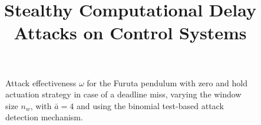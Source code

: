 \documentclass{article}
\title{Stealthy Computational Delay Attacks on Control Systems}
\renewcommand{\a}{a}
\newcommand{\maxa}{\bar{\a}}
\newcommand{\vecsize}[1]{n_{#1}}
\newcommand{\iteration}{w}
\newcommand{\aeffect}{\omega}
\begin{document}
\maketitle

\begin{figure*}
    \centering
    
    \vspace{-1cm}
    \caption{Attack effectiveness $\aeffect$ for the Furuta pendulum with zero and hold actuation strategy in case of a deadline miss, varying the window size $\vecsize{\iteration}$, with $\maxa=4$ and using the binomial test-based attack detection mechanism.}
    \label{fig:effect_zerohold}
\end{figure*}
\end{document}
